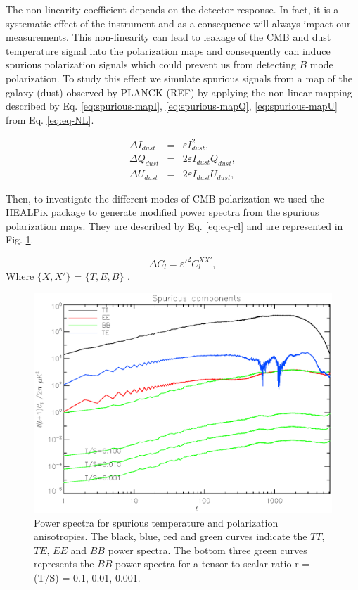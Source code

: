 The non-linearity coefficient depends on the detector response. In fact, it is a systematic effect of the instrument and as a consequence will always impact our measurements. This non-linearity can lead to leakage of the CMB and dust temperature signal into the polarization maps and consequently can induce spurious polarization signals which could prevent us from detecting $B$ mode polarization. 
To study this effect we simulate spurious signals from a map of the galaxy (dust) observed by PLANCK (REF) by applying the non-linear mapping described by Eq. \ref{eq:spurious-mapI}, \ref{eq:spurious-mapQ}, \ref{eq:spurious-mapU} from Eq. \ref{eq:eq-NL}.

\begin{eqnarray}
\label{eq:spurious-mapI}
\Delta I_{dust}  &=& \varepsilon I_{dust}^{2},\\
\label{eq:spurious-mapQ}
\Delta Q_{dust}  &=& 2\varepsilon I_{dust}Q_{dust},\\
\label{eq:spurious-mapU}
\Delta U_{dust} &=& 2 \varepsilon I_{dust}U_{dust},
\end{eqnarray}

Then, to investigate the different modes of CMB polarization we used the HEALPix package \citep{2005ApJ...622..759G} to generate modified power spectra from the spurious polarization maps. They are described by Eq. \ref{eq:eq-cl} and are represented in Fig. \ref{fig:cl2}.

\begin{equation}
\Delta C_{l} = \varepsilon'^{2} C_{l}^{XX'},
\label{eq:eq-cl}
\end{equation}
Where $\lbrace X,X' \rbrace$ = $\lbrace T,E,B \rbrace$ .\\

\begin{figure}[h]
\center
	\includegraphics[scale=0.55]{Figures/cl2.eps}
	\caption{Power spectra for spurious temperature and polarization anisotropies. The black, blue, red and green curves indicate the $TT$, $TE$, $EE$ and $BB$ power spectra. The bottom three green curves represents the $BB$ power spectra for a tensor-to-scalar ratio r = (T/S) = 0.1, 0.01, 0.001.}
	\label{fig:cl2}
\end{figure}

